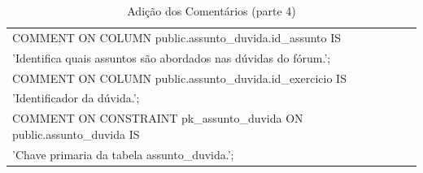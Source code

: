 \documentclass[graduacao,brazil]{ThesisPUC}
\begin{document}
\begin{table}[H]
{\begin{tabular}{|l|}
    COMMENT ON COLUMN public.assunto\_duvida.id\_assunto IS \\'Identifica quais assuntos são abordados nas dúvidas do fórum.'; \\COMMENT ON COLUMN public.assunto\_duvida.id\_exercicio IS \\'Identificador da dúvida.'; \\COMMENT ON CONSTRAINT pk\_assunto\_duvida ON public.assunto\_duvida IS \\'Chave primaria da tabela assunto\_duvida.';                                                                                                                                                                                                                                                                                                                       \\ \hline
    \end{tabular}
    }
    \caption {Adi\c{c}\~{a}o dos Coment\'{a}rios (parte 4)}
\end{table}
\end{document}
